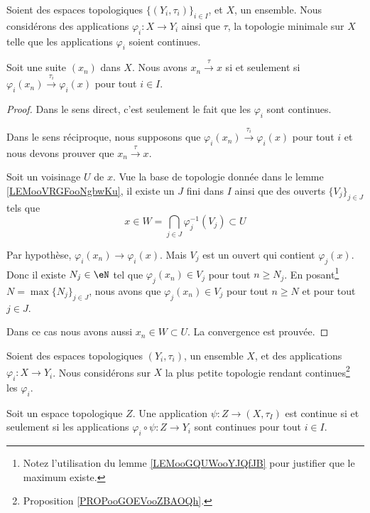 \begin{lemma}     \label{LEMooADPLooYylNsj}
	Soient des espaces topologiques \( \{ (Y_i,\tau_i) \}_{i\in I}\), et \( X\), un ensemble. Nous considérons des applications \( \varphi_i\colon X\to Y_i\) ainsi que \( \tau\), la topologie minimale sur \( X\) telle que les applications \( \varphi_i\) soient continues.

	Soit une suite \( (x_n)\) dans \( X\). Nous avons \( x_n\stackrel{\tau}{\longrightarrow}x\) si et seulement si \( \varphi_i(x_n)\stackrel{\tau_i}{\longrightarrow}\varphi_i(x)\) pour tout \( i\in I\).
\end{lemma}

\begin{proof}
	Dans le sens direct, c'est seulement le fait que les \( \varphi_i\) sont continues.

	Dans le sens réciproque, nous supposons que \( \varphi_i(x_n)\stackrel{\tau_i}{\longrightarrow}\varphi_i(x)\) pour tout \( i\) et nous devons prouver que \( x_n\stackrel{\tau}{\longrightarrow}x\).

	Soit un voisinage \( U\) de \( x\). Vue la base de topologie donnée dans le lemme \ref{LEMooVRGFooNgbwKu}, il existe un \( J\) fini dans \( I\) ainsi que des ouverts \( \{ V_j \}_{j\in J}\) tels que
	\begin{equation}
		x\in W=\bigcap_{j\in J}\varphi_j^{-1}(V_j)\subset U
	\end{equation}

	Par hypothèse, \( \varphi_i(x_n)\to\varphi_i(x)\). Mais \( V_j\) est un ouvert qui contient \( \varphi_j(x)\). Donc il existe \( N_j\in \eN\) tel que \( \varphi_j(x_n)\in V_j\) pour tout \( n\geq N_j\). En posant\footnote{Notez l'utilisation du lemme \ref{LEMooGQUWooYJQfJB} pour justifier que le maximum existe.} \( N=\max\{ N_j \}_{j\in J}\), nous avons que \( \varphi_j(x_n)\in V_j\) pour tout \( n\geq N\) et pour tout \( j\in J\).

	Dans ce cas nous avons aussi \( x_n\in W\subset U\). La convergence est prouvée.
\end{proof}

\begin{proposition}
	Soient des espaces topologiques \( (Y_i,\tau_i)\), un ensemble \( X\), et des applications \( \varphi_i\colon X\to Y_i\). Nous considérons sur \( X\) la plus petite topologie rendant continues\footnote{Proposition \ref{PROPooGOEVooZBAOQh}.} les \( \varphi_i\).

	Soit un espace topologique \( Z\). Une application \( \psi\colon Z\to (X,\tau_I)\) est continue si et seulement si les applications \( \varphi_i\circ\psi\colon Z\to Y_i\) sont continues pour tout \( i\in I\).
\end{proposition}

